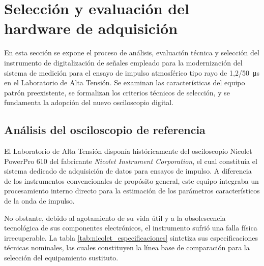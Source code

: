 \section{Selección y evaluación del hardware de adquisición}
\label{sec:seleccion_hardware}

En esta sección se expone el proceso de análisis, evaluación técnica y selección del instrumento de digitalización de señales empleado para la modernización del sistema de medición para el ensayo de impulso atmosférico tipo rayo de \qty[parse-numbers=false]{1,2/50}{\micro\second} en el Laboratorio de Alta Tensión. Se examinan las características del equipo patrón preexistente, se formalizan los criterios técnicos de selección, y se fundamenta la adopción del nuevo osciloscopio digital.

\subsection{Análisis del osciloscopio de referencia}
\label{subsec:nicolet_referencia}

El Laboratorio de Alta Tensión disponía históricamente del osciloscopio Nicolet PowerPro 610 del fabricante \emph{Nicolet Instrument Corporation}, el cual constituía el sistema dedicado de adquisición de datos para ensayos de impulso. A diferencia de los instrumentos convencionales de propósito general, este equipo integraba un procesamiento interno directo para la estimación de los parámetros característicos de la onda de impulso.

No obstante, debido al agotamiento de su vida útil y a la obsolescencia tecnológica de sus componentes electrónicos, el instrumento sufrió una falla física irrecuperable. La tabla \ref{tab:nicolet_especificaciones} sintetiza sus especificaciones técnicas nominales, las cuales constituyen la línea base de comparación para la selección del equipamiento sustituto.

